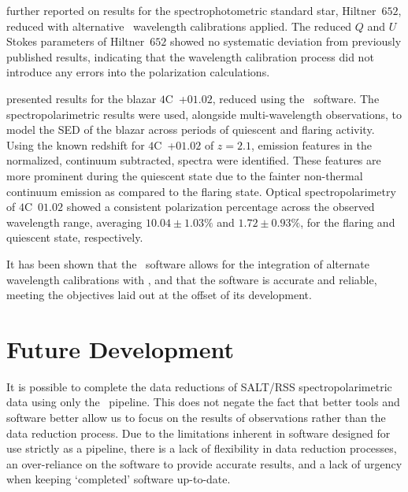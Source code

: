 \citet{Cooper_HEASA2022} further reported on results for the spectrophotometric standard star, Hiltner~$652$, reduced with alternative \iraf\ wavelength calibrations applied.
The reduced $Q$ and $U$ Stokes parameters of Hiltner~$652$ showed no systematic deviation from previously published results, indicating that the wavelength calibration process did not introduce any errors into the polarization calculations.

\citet{Schutte4C0102} presented results for the blazar $4$C~+$01.02$, reduced using the \stops\ software.
The spectropolarimetric results were used, alongside multi-wavelength observations, to model the \gls{SED} of the blazar across periods of quiescent and flaring activity.
Using the known redshift for $4$C~+$01.02$ of $z = 2.1$, emission features in the normalized, continuum subtracted, spectra were identified.
These features are more prominent during the quiescent state due to the fainter non-thermal continuum emission as compared to the flaring state.
Optical spectropolarimetry of $4$C~$01.02$ showed a consistent polarization percentage across the observed wavelength range, averaging $10.04 \pm 1.03 \%$ and $1.72 \pm 0.93 \%$, for the flaring and quiescent state, respectively.

It has been shown that the \stops\ software allows for the integration of alternate wavelength calibrations with \polsalt, and that the software is accurate and reliable, meeting the objectives laid out at the offset of its development.

\section{Future Development} \label{sec:future}

It is possible to complete the data reductions of \gls{SALT}/\gls{RSS} spectropolarimetric data using only the \polsalt\ pipeline.
This does not negate the fact that better tools and software better allow us to focus on the results of observations rather than the data reduction process.
Due to the limitations inherent in software designed for use strictly as a pipeline, there is a lack of flexibility in data reduction processes, an over-reliance on the software to provide accurate results, and a lack of urgency when keeping `completed' software up-to-date.

